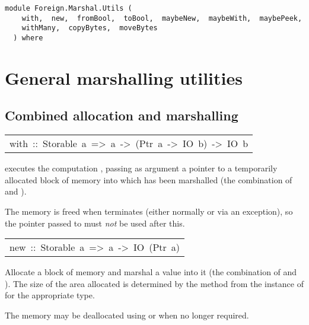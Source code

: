 \label{module:Foreign.Marshal.Utils}
\haddockbeginheader
{\haddockverb\begin{verbatim}
module Foreign.Marshal.Utils (
    with,  new,  fromBool,  toBool,  maybeNew,  maybeWith,  maybePeek, 
    withMany,  copyBytes,  moveBytes
  ) where\end{verbatim}}
\haddockendheader

\section{General marshalling utilities
}
\subsection{Combined allocation and marshalling
}
\begin{haddockdesc}
\item[\begin{tabular}{@{}l}
with\ ::\ Storable\ a\ =>\ a\ ->\ (Ptr\ a\ ->\ IO\ b)\ ->\ IO\ b
\end{tabular}]\haddockbegindoc
{} executes the computation , passing as argument
 a pointer to a temporarily allocated block of memory into which
  has been marshalled (the combination of  and ).
\par
The memory is freed when  terminates (either normally or via an
 exception), so the pointer passed to  must \emph{not} be used after this.
\par

\end{haddockdesc}
\begin{haddockdesc}
\item[\begin{tabular}{@{}l}
new\ ::\ Storable\ a\ =>\ a\ ->\ IO\ (Ptr\ a)
\end{tabular}]\haddockbegindoc
Allocate a block of memory and marshal a value into it
 (the combination of  and ).
 The size of the area allocated is determined by the 
 method from the instance of  for the appropriate type.
\par
The memory may be deallocated using  or
  when no longer required.
\par

\end{haddockdesc}
